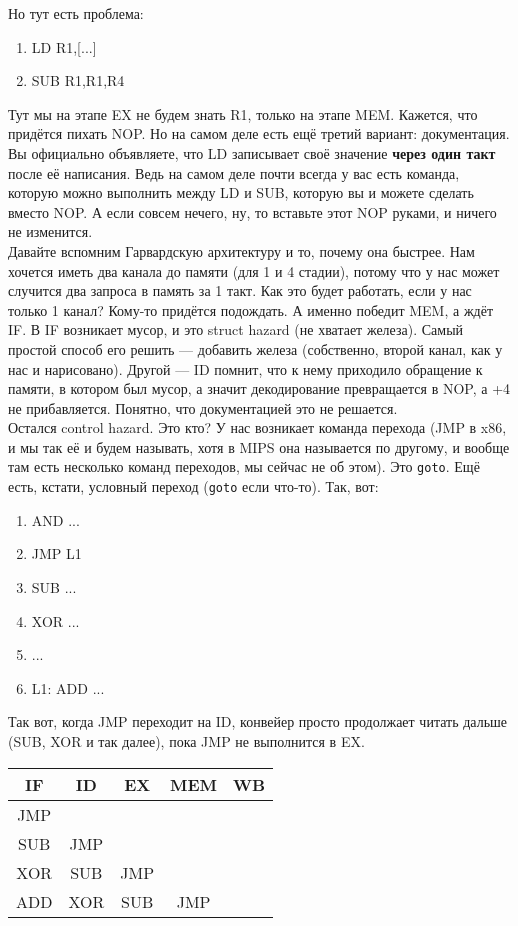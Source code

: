 \documentclass{article}
\begin{document}
    Но тут есть проблема:
    \begin{enumerate}[1.]
        \item LD R1,[...]
        \item SUB R1,R1,R4
    \end{enumerate}
    Тут мы на этапе EX не будем знать R1, только на этапе MEM. Кажется, что придётся пихать NOP. Но на самом деле есть ещё третий вариант: документация. Вы официально объявляете, что LD записывает своё значение \textbf{через один такт} после её написания. Ведь на самом деле почти всегда у вас есть команда, которую можно выполнить между LD и SUB, которую вы и можете сделать вместо NOP. А если совсем нечего, ну, то вставьте этот NOP руками, и ничего не изменится.\\
    Давайте вспомним Гарвардскую архитектуру и то, почему она быстрее. Нам хочется иметь два канала до памяти (для 1 и 4 стадии), потому что у нас может случится два запроса в память за 1 такт. Как это будет работать, если у нас только 1 канал? Кому-то придётся подождать. А именно победит MEM, а ждёт IF. В IF возникает мусор, и это struct hazard (не хватает железа). Самый простой способ его решить --- добавить железа (собственно, второй канал, как у нас и нарисовано). Другой --- ID помнит, что к нему приходило обращение к памяти, в котором был мусор, а значит декодирование превращается в NOP, а +4 не прибавляется. Понятно, что документацией это не решается.\\
    Остался control hazard. Это кто? У нас возникает команда перехода (JMP в x86, и мы так её и будем называть, хотя в MIPS она называется по другому, и вообще там есть несколько команд переходов, мы сейчас не об этом). Это \texttt{goto}. Ещё есть, кстати, условный переход (\texttt{goto} если что-то). Так, вот:
    \begin{enumerate}[1.]
        \item AND ...
        \item JMP L1
        \item SUB ...
        \item XOR ...
        \item ...
        \item L1: ADD ...
    \end{enumerate}
    Так вот, когда JMP переходит на ID, конвейер просто продолжает читать дальше (SUB, XOR и так далее), пока JMP не выполнится в EX.
    \begin{center}
        \begin{tabular}{|c|c|c|c|c|}
            \hline
            IF & ID & EX & MEM & WB\\
            \hline
            JMP &  &  &  & \\
            SUB & JMP &  &  & \\
            XOR & SUB & JMP &  & \\
            ADD & XOR & SUB & JMP & \\
            \hline
        \end{tabular}
    \end{center}
\end{document}
